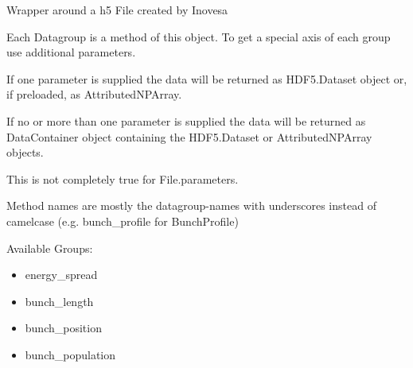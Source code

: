 \documentclass[letterpaper,10pt,openany,oneside,english]{sphinxmanual}
\begin{document}

\begin{fulllineitems}
\label{\detokenize{file:file.File}}
Wrapper around a h5 File created by Inovesa

Each Datagroup is a method of this object. To get a special axis of each group  
use additional parameters.

If one parameter is supplied the data will be returned as HDF5.Dataset object or, if preloaded,  
as AttributedNPArray.

If no or more than one parameter is supplied the data will be returned as DataContainer  
object containing the HDF5.Dataset or AttributedNPArray objects.

This is not completely true for File.parameters.

\begin{sphinxVerbatim}[commandchars=\\\{\}]
    
    
    
    
    
     
\end{sphinxVerbatim}

Method names are mostly the datagroup-names with underscores instead of camelcase  
(e.g. bunch\_profile for BunchProfile)

Available Groups:
\begin{itemize}
\item {} 
energy\_spread

\item {} 
bunch\_length

\item {} 
bunch\_position

\item {} 
bunch\_population


\end{itemize}
\end{fulllineitems}
\end{document}
